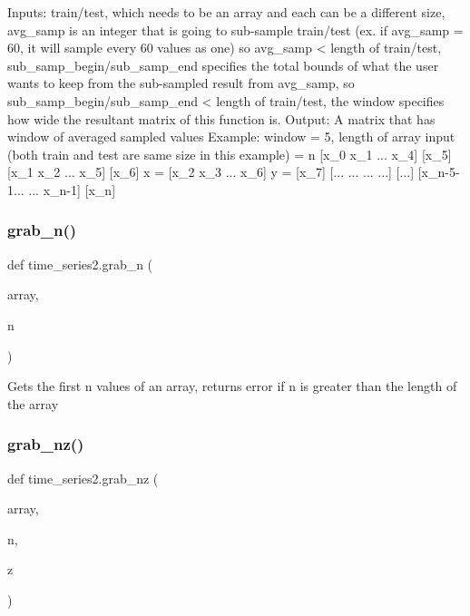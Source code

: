 \begin{DoxyVerb}Inputs: train/test, which needs to be an array and each can be a different size, avg_samp is 
 an integer that is going to sub-sample train/test (ex. if avg_samp = 60, it will sample every 60 values as one) so 
 avg_samp < length of train/test, sub_samp_begin/sub_samp_end specifies the total bounds of what the user wants 
 to keep from the sub-sampled result from avg_samp, so sub_samp_begin/sub_samp_end < length of train/test, the window
 specifies how wide the resultant matrix of this function is.
 Output: A matrix that has window of averaged sampled values
 Example: window = 5, length of array input (both train and test are same size in this example) = n
     [x_0 x_1 ... x_4]          [x_5]
     [x_1 x_2 ... x_5]          [x_6]
 x = [x_2 x_3 ... x_6]     y =  [x_7]
     [... ... ... ...]          [...]
     [x_n-5-1... ... x_n-1]     [x_n]\end{DoxyVerb}
 \mbox{\label{namespacetime__series2_a31fa5faf99bfb7d4e08f53e5f04d77e0}} 
\subsubsection{\texorpdfstring{grab\+\_\+n()}{grab\_n()}}
{\footnotesize\ttfamily def time\+\_\+series2.\+grab\+\_\+n (\begin{DoxyParamCaption}\item[{}]{array,  }\item[{}]{n }\end{DoxyParamCaption})}

\begin{DoxyVerb}Gets the first n values of an array, returns error if n is greater than the length of the array\end{DoxyVerb}
 \mbox{\label{namespacetime__series2_a82eef0f2d8234468ad48ed485a433494}} 
\subsubsection{\texorpdfstring{grab\+\_\+nz()}{grab\_nz()}}
{\footnotesize\ttfamily def time\+\_\+series2.\+grab\+\_\+nz (\begin{DoxyParamCaption}\item[{}]{array,  }\item[{}]{n,  }\item[{}]{z }\end{DoxyParamCaption})}

